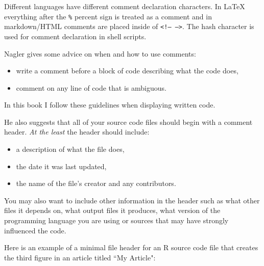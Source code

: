 \documentclass[krantz1]{krantz}
\begin{document}
Different languages have different comment declaration characters. In LaTeX everything after the {\tt{\%}} percent sign is treated as a comment and in markdown/HTML comments are placed inside of {\tt{\textless !-- --\textgreater}}. The hash character is used for comment declaration in shell scripts.

Nagler \citeyearpar[491]{Nagler1995} gives some advice on when and how to use comments:

\begin{itemize}
    \item write a comment before a block of code describing what the code does,
    \item comment on any line of code that is ambiguous.
\end{itemize}

\noindent In this book I follow these guidelines when displaying written code. 

He also suggests that all of your source code files should begin with a comment header. {\emph{At the least}} the header should include:

\begin{itemize}
    \item a description of what the file does,
    \item the date it was last updated,
    \item the name of the file's creator and any contributors.
\end{itemize}

\noindent You may also want to include other information in the header such as what other files it depends on, what output files it produces, what version of the programming language you are using or sources that may have strongly influenced the code. 

Here is an example of a minimal file header for an R source code file that creates the third figure in an article titled ``My Article":

\begin{knitrout}
\color{fgcolor}\begin{kframe}
\begin{alltt}
\hlcomment{##################}
\hlcomment{##################}
\end{alltt}
\end{kframe}
\end{knitrout}
\end{document}
